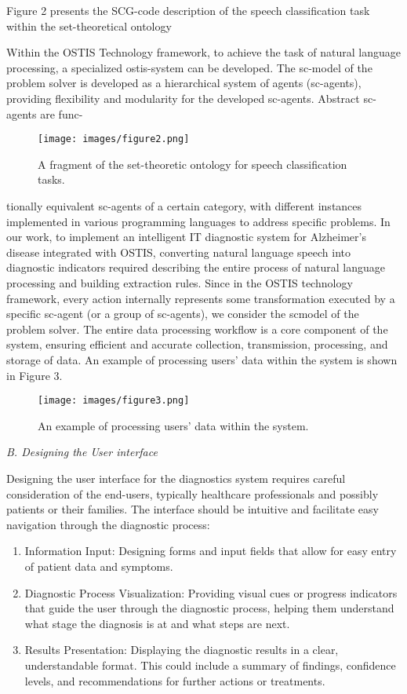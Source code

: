 \documentclass{scndocument}
\begin{document}
\begin{multicols*}{2}
Figure 2 presents the SCG-code description of the speech classification task within the set-theoretical ontology

Within the OSTIS Technology framework, to achieve the task of natural language processing, a specialized ostis-system can be developed. The sc-model of the problem solver is developed as a hierarchical system of agents (sc-agents), providing flexibility and modularity for the developed sc-agents. Abstract sc-agents are func-

\begin{figure}[H]
    \centering
    \texttt{[image: images/figure2.png]}
    \caption{A fragment of the set-theoretic ontology for speech classification tasks.}
\end{figure}

\noindent tionally equivalent sc-agents of a certain category, with different instances implemented in various programming languages to address specific problems. In our work, to implement an intelligent IT diagnostic system for Alzheimer’s disease integrated with OSTIS, converting natural language speech into diagnostic indicators required describing the entire process of natural language processing and building extraction rules. Since in the OSTIS technology framework, every action internally represents some transformation executed by a specific sc-agent (or a group of sc-agents), we consider the scmodel of the problem solver. The entire data processing workflow is a core component of the system, ensuring efficient and accurate collection, transmission, processing, and storage of data. An example of processing users’ data within the system is shown in Figure 3.

\begin{figure}[H]
    \centering
    \texttt{[image: images/figure3.png]}
    \caption{An example of processing users’ data within the system.}
\end{figure}

\noindent\textit{B. Designing the User interface}
\vspace{2mm}

Designing the user interface for the diagnostics system requires careful consideration of the end-users, typically healthcare professionals and possibly patients or their families. The interface should be intuitive and facilitate easy navigation through the diagnostic process:
\begin{enumerate}[label=\arabic*), noitemsep]
\item Information Input: Designing forms and input fields that allow for easy entry of patient data and symptoms.
\item Diagnostic Process Visualization: Providing visual cues or progress indicators that guide the user through the diagnostic process, helping them understand what stage the diagnosis is at and what steps are next.
\item Results Presentation: Displaying the diagnostic results in a clear, understandable format. This could include a summary of findings, confidence levels, and recommendations for further actions or treatments.
\end{enumerate}


\end{multicols*}
\end{document}
